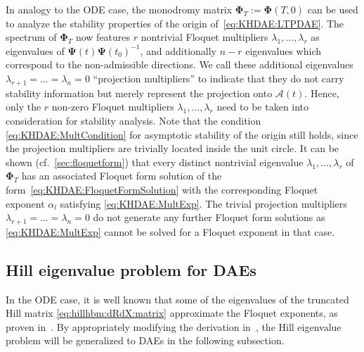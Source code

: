 \documentclass[a4paper, nonatbib, 3p, twocolumn]{elsarticle}
\theoremstyle{plain}
\theoremstyle{definition}
\theoremstyle{remark}
\newcommand{\mo}{\vPh_T}
\newcommand{\vPh}{\mathbf \Phi}
\newcommand{\vPs}{\mathbf \Psi}
\newcommand{\cA}{\mathcal{A}}
\begin{document}
In analogy to the ODE case, the monodromy matrix $\mo:=\vPh(T, 0)$ can be used to analyze the stability properties of the origin of~\eqref{eq:KHDAE:LTPDAE}. 
The spectrum of $\mo$ now features $r$ nontrivial Floquet multipliers $\lambda_1, \dots, \lambda_r$ as eigenvalues of $\vPs(t) \vPs(t_0)^{-1}$, and additionally $n-r$ eigenvalues which correspond to the non-admissible directions.
We call these additional eigenvalues $\lambda_{r+1}= \dots= \lambda_n = 0$
``projection multipliers'' to indicate that they do not carry stability information but merely represent the projection onto $\cA(t)$.
Hence, only the $r$ non-zero Floquet multipliers $\lambda_1, \dots, \lambda_r$ need to be taken into consideration for stability analysis.
Note that the condition \eqref{eq:KHDAE:MultCondition} for asymptotic stability of the origin still holds, since the projection multipliers are trivially located inside the unit circle.
It can be shown (cf.\ \ref{sec:floquetform}) that every distinct nontrivial eigenvalue $\lambda_1, \dots, \lambda_r$ of $\mo$ has an associated Floquet form solution of the form~\eqref{eq:KHDAE:FloquetFormSolution} with the corresponding Floquet exponent $\alpha_l$ satisfying \eqref{eq:KHDAE:MultExp}. The trivial projection multipliers $\lambda_{r+1}= \dots= \lambda_n=0$ do not generate any further Floquet form solutions as \eqref{eq:KHDAE:MultExp} cannot be solved for a Floquet exponent in that case.


\subsection{Hill eigenvalue problem for DAEs}\label{ch:KHDAE:Hill}

In the ODE case, it is well known that some of the eigenvalues of the truncated Hill matrix \eqref{eq:hillhbm:dRdX:matrix} approximate the Floquet exponents, as proven in~\cite{Zhou2004}.
By appropriately modifying the derivation in~\cite{Lazarus2010}, the Hill eigenvalue problem will be generalized to DAEs in the following subsection.
\end{document}
